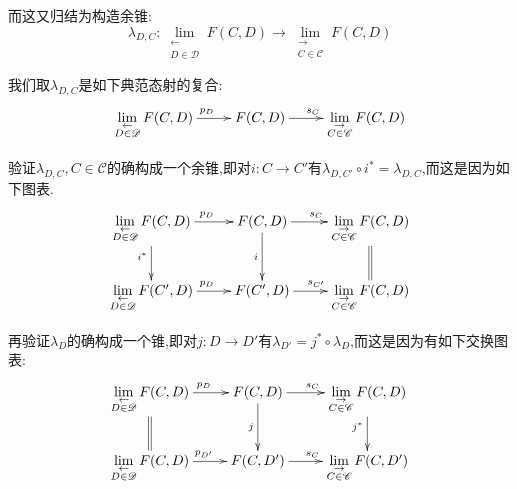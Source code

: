 \begin{enumerate}
    而这又归结为构造余锥:
    $$\lambda_{D,C}:\lim\limits_{\substack{\leftarrow\\D\in\mathscr{D}}}F(C,D)\to\lim\limits_{\substack{\rightarrow\\C\in\mathscr{C}}}F(C,D)$$
    
    我们取$\lambda_{D,C}$是如下典范态射的复合:
    $$\xymatrix{\lim\limits_{\substack{\leftarrow\\D\in\mathscr{D}}}F(C,D)\ar[r]^{p_D}&F(C,D)\ar[r]^{s_C}&\lim\limits_{\substack{\rightarrow\\C\in\mathscr{C}}}F(C,D)}$$
    
    验证$\lambda_{D,C},C\in\mathscr{C}$的确构成一个余锥,即对$i:C\to C'$有$\lambda_{D,C'}\circ i^*=\lambda_{D,C}$,而这是因为如下图表.
    $$\xymatrix{\lim\limits_{\substack{\leftarrow\\D\in\mathscr{D}}}F(C,D)\ar[r]^{p_D}\ar[d]_{i^*}&F(C,D)\ar[r]^{s_C}\ar[d]_i&\lim\limits_{\substack{\rightarrow\\C\in\mathscr{C}}}F(C,D)\ar@{=}[d]\\\lim\limits_{\substack{\leftarrow\\D\in\mathscr{D}}}F(C',D)\ar[r]^{p_D}&F(C',D)\ar[r]^{s_{C'}}&\lim\limits_{\substack{\rightarrow\\C\in\mathscr{C}}}F(C,D)}$$
    
    再验证$\lambda_D$的确构成一个锥,即对$j:D\to D'$有$\lambda_{D'}=j^*\circ\lambda_D$,而这是因为有如下交换图表:
    $$\xymatrix{\lim\limits_{\substack{\leftarrow\\D\in\mathscr{D}}}F(C,D)\ar[r]^{p_D}\ar@{=}[d]&F(C,D)\ar[r]^{s_C}\ar[d]_j&\lim\limits_{\substack{\rightarrow\\C\in\mathscr{C}}}F(C,D)\ar[d]_{j^*}\\\lim\limits_{\substack{\leftarrow\\D\in\mathscr{D}}}F(C,D)\ar[r]^{p_{D'}}&F(C,D')\ar[r]^{s_C}&\lim\limits_{\substack{\rightarrow\\C\in\mathscr{C}}}F(C,D')}$$
    

\end{enumerate}
